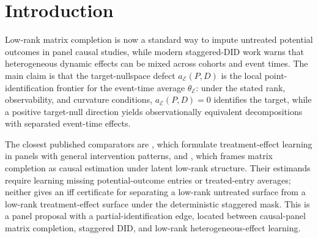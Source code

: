 \documentclass[11pt]{article}
\theoremstyle{definition}
\theoremstyle{plain}
\theoremstyle{remark}
\begin{document}
\begin{abstract}
This proposal asks when a staggered-treatment panel can distinguish low-rank untreated heterogeneity from a low-rank treatment-effect surface rather than absorbing the effect surface into the matrix-completion counterfactual.  The kernel is the target-nullspace defect \(a_{\mathcal E}(P,D)\), with the separability singular value \(\sigma_{\mathrm{obs}}(P,D)\) as the stronger surface-recovery certificate.  The flagship conjecture is a scalar local-identification frontier: \(\theta_{\mathcal E}\) is identified exactly when every tangent null direction has zero event-time average and the named curvature remainder is dominated on the local ball; positive \(\sigma_{\mathrm{obs}}\) then gives asymptotically linear separable completion.  The strict gap relative to causal matrix-completion estimators is that the estimand is not merely a missing untreated surface, but a two-surface decomposition \(Y=M^0+D\circ\tau\) whose event-time effect can be unidentified even when a low-rank completion of the observed matrix is unique.  If resolved, the result would tell staggered-adoption researchers when low-rank imputation is safe for heterogeneous dynamic effects and when it can mechanically erase the treatment surface it is meant to estimate.
\end{abstract}

\section{Introduction}
Low-rank matrix completion is now a standard way to impute untreated potential outcomes in panel causal studies, while modern staggered-DID work warns that heterogeneous dynamic effects can be mixed across cohorts and event times.  The main claim is that the target-nullspace defect \(a_{\mathcal E}(P,D)\) is the local point-identification frontier for the event-time average \(\theta_{\mathcal E}\): under the stated rank, observability, and curvature conditions, \(a_{\mathcal E}(P,D)=0\) identifies the target, while a positive target-null direction yields observationally equivalent decompositions with separated event-time effects.

The closest published comparators are \citet[Sections 2--3]{FariasLiPeng2021}, which formulate treatment-effect learning in panels with general intervention patterns, and \citet[Sections 2--3]{AgarwalDahlehShahShen2023}, which frames matrix completion as causal estimation under latent low-rank structure.  Their estimands require learning missing potential-outcome entries or treated-entry averages; neither gives an iff certificate for separating a low-rank untreated surface from a low-rank treatment-effect surface under the deterministic staggered mask.  This is a panel proposal with a partial-identification edge, located between causal-panel matrix completion, staggered DID, and low-rank heterogeneous-effect learning.
\end{document}
